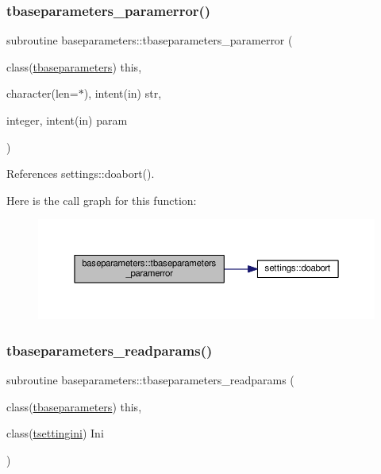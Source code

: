 \mbox{\label{namespacebaseparameters_a3126d9d902d7cc3f30105a9ad35e4a04}} 
\subsubsection{\texorpdfstring{tbaseparameters\+\_\+paramerror()}{tbaseparameters\_paramerror()}}
{\footnotesize\ttfamily subroutine baseparameters\+::tbaseparameters\+\_\+paramerror (\begin{DoxyParamCaption}\item[{class(\mbox{\hyperlink{structbaseparameters_1_1tbaseparameters}{tbaseparameters}})}]{this,  }\item[{character(len=$\ast$), intent(in)}]{str,  }\item[{integer, intent(in)}]{param }\end{DoxyParamCaption})\hspace{0.3cm}{\ttfamily [private]}}



References settings\+::doabort().

Here is the call graph for this function\+:
\nopagebreak
\begin{figure}[H]
\begin{center}
\leavevmode
\includegraphics[width=350pt]{namespacebaseparameters_a3126d9d902d7cc3f30105a9ad35e4a04_cgraph}
\end{center}
\end{figure}
\mbox{\label{namespacebaseparameters_ae26154e8a07fc378e0e669659de1025a}} 
\subsubsection{\texorpdfstring{tbaseparameters\+\_\+readparams()}{tbaseparameters\_readparams()}}
{\footnotesize\ttfamily subroutine baseparameters\+::tbaseparameters\+\_\+readparams (\begin{DoxyParamCaption}\item[{class(\mbox{\hyperlink{structbaseparameters_1_1tbaseparameters}{tbaseparameters}})}]{this,  }\item[{class(\mbox{\hyperlink{structsettings_1_1tsettingini}{tsettingini}})}]{Ini }\end{DoxyParamCaption})\hspace{0.3cm}{\ttfamily [private]}}




